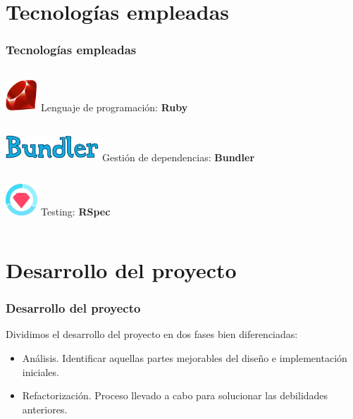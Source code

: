 \documentclass{beamer}
\begin{document}

\section{Tecnologías empleadas}
\begin{frame}[fragile]
  \frametitle{Tecnologías empleadas}
  \begin{columns}
       \centering
       \includegraphics[height=1.2cm, width=1.2cm]{img/ruby-logo.png}
        Lenguaje de programación: \textbf{Ruby}
  \end{columns}
  \bigskip

  \begin{columns}
       \centering
       \includegraphics[height=1cm, width=3.5cm]{img/bundler-logo.png}
        Gestión de dependencias: \textbf{Bundler}
  \end{columns}
  \bigskip

  \begin{columns}
       \centering
       \includegraphics[height=1.2cm, width=1.2cm]{img/rspec-logo.png}
        Testing: \textbf{RSpec}
  \end{columns}
\end{frame}

\section{Desarrollo del proyecto}
\begin{frame}
\frametitle{Desarrollo del proyecto}
  Dividimos el desarrollo del proyecto en dos fases bien diferenciadas:
  \begin{itemize}
    \item Análisis. Identificar aquellas partes mejorables del diseño e implementación iniciales.
    \item Refactorización. Proceso llevado a cabo para solucionar las debilidades anteriores.
  \end{itemize}
\end{frame}
\end{document}
